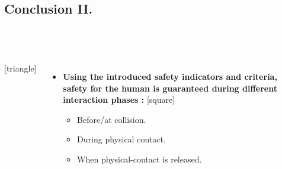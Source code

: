 \subsection{Conclusion II.}
\begin{frame}
\frametitle{{\textcolor{white}{\hspace{0.2cm}Conclusion II}}}
\begin{columns}
\column{\paperwidth-10mm}
[triangle]
\begin{itemize}
\item \textbf{Using the introduced safety indicators and criteria, {\color{red}safety for the human is guaranteed during different interaction phases :}  }
\setlength\itemsep{-0.5em}  
[square]
\begin{itemize}
\item Before/at collision.
\item During physical contact.
\item When physical-contact is released.
\end{itemize}
\end{itemize}
\end{columns}
\end{frame}








